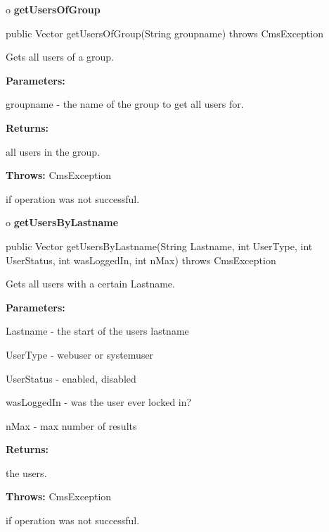 o {\bf getUsersOfGroup}

\begin{PRE}
 public Vector getUsersOfGroup(String groupname) throws CmsException
\end{PRE}

\begin{description}
\htmlDD Gets all users of a group.

\begin{description}
\item {\bf Parameters:}

groupname - the name of the group to get all users for.
\item {\bf Returns:}

all users in the group.
\item {\bf Throws:} CmsException

if operation was not successful.
\end{description}

\end{description}

o {\bf getUsersByLastname}

\begin{PRE}
 public Vector getUsersByLastname(String Lastname,
                                  int UserType,
                                  int UserStatus,
                                  int wasLoggedIn,
                                  int nMax) throws CmsException
\end{PRE}

\begin{description}
\htmlDD Gets all users with a certain Lastname.

\begin{description}
\item {\bf Parameters:}

Lastname - the start of the users lastname

UserType - webuser or systemuser

UserStatus - enabled, disabled

wasLoggedIn - was the user ever locked in?

nMax - max number of results
\item {\bf Returns:}

the users.
\item {\bf Throws:} CmsException

if operation was not successful.
\end{description}

\end{description}

